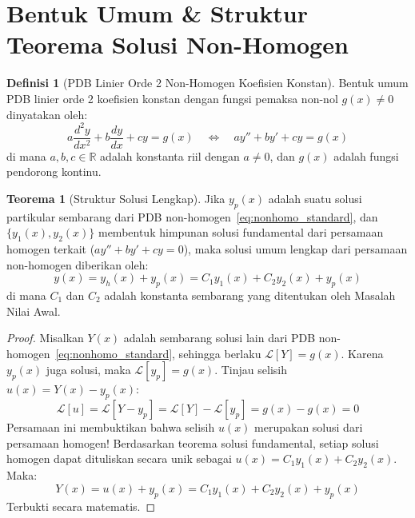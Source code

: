 \documentclass[11pt,a4paper]{article}
\theoremstyle{definition}
\newtheorem{definition}{Definisi}[section]
\newtheorem{theorem}{Teorema}[section]
\begin{document}
\section{Bentuk Umum \& Struktur Teorema Solusi Non-Homogen}

\begin{definition}[PDB Linier Orde 2 Non-Homogen Koefisien Konstan]
Bentuk umum PDB linier orde 2 koefisien konstan dengan fungsi pemaksa non-nol $g(x) \neq 0$ dinyatakan oleh:
\begin{equation}
    a \frac{d^2y}{dx^2} + b \frac{dy}{dx} + c y = g(x) \quad \iff \quad a y'' + b y' + c y = g(x)
    \label{eq:nonhomo_standard}
\end{equation}
di mana $a, b, c \in \mathbb{R}$ adalah konstanta riil dengan $a \neq 0$, dan $g(x)$ adalah fungsi pendorong kontinu.
\end{definition}

\begin{theorem}[Struktur Solusi Lengkap]
Jika $y_p(x)$ adalah suatu solusi partikular sembarang dari PDB non-homogen~\eqref{eq:nonhomo_standard}, dan $\{y_1(x), y_2(x)\}$ membentuk himpunan solusi fundamental dari persamaan homogen terkait ($a y'' + b y' + c y = 0$), maka solusi umum lengkap dari persamaan non-homogen diberikan oleh:
\begin{equation}
    y(x) = y_h(x) + y_p(x) = C_1 y_1(x) + C_2 y_2(x) + y_p(x)
    \label{eq:complete_solution_structure}
\end{equation}
di mana $C_1$ dan $C_2$ adalah konstanta sembarang yang ditentukan oleh Masalah Nilai Awal.
\end{theorem}

\begin{proof}
Misalkan $Y(x)$ adalah sembarang solusi lain dari PDB non-homogen~\eqref{eq:nonhomo_standard}, sehingga berlaku $\mathcal{L}[Y] = g(x)$. Karena $y_p(x)$ juga solusi, maka $\mathcal{L}[y_p] = g(x)$. Tinjau selisih $u(x) = Y(x) - y_p(x)$:
\begin{equation*}
    \mathcal{L}[u] = \mathcal{L}[Y - y_p] = \mathcal{L}[Y] - \mathcal{L}[y_p] = g(x) - g(x) = 0
\end{equation*}
Persamaan ini membuktikan bahwa selisih $u(x)$ merupakan solusi dari persamaan homogen! Berdasarkan teorema solusi fundamental, setiap solusi homogen dapat dituliskan secara unik sebagai $u(x) = C_1 y_1(x) + C_2 y_2(x)$. Maka:
\begin{equation*}
    Y(x) = u(x) + y_p(x) = C_1 y_1(x) + C_2 y_2(x) + y_p(x)
\end{equation*}
Terbukti secara matematis.
\end{proof}
\end{document}
